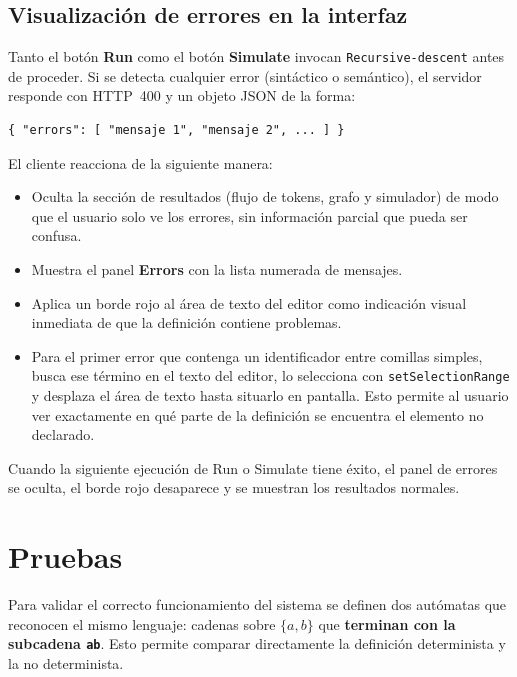 \documentclass{article}
\begin{document}
\subsection{Visualización de errores en la interfaz}

Tanto el botón \textbf{Run} como el botón \textbf{Simulate} invocan
\texttt{Recursive-descent} antes de proceder.
Si se detecta cualquier error (sintáctico o semántico), el servidor responde con
HTTP~400 y un objeto JSON de la forma:

\begin{verbatim}
{ "errors": [ "mensaje 1", "mensaje 2", ... ] }
\end{verbatim}

El cliente reacciona de la siguiente manera:

\begin{itemize}
  \item Oculta la sección de resultados (flujo de tokens, grafo y simulador)
        de modo que el usuario solo ve los errores, sin información parcial
        que pueda ser confusa.
  \item Muestra el panel \textbf{Errors} con la lista numerada de mensajes.
  \item Aplica un borde rojo al área de texto del editor como indicación visual
        inmediata de que la definición contiene problemas.
  \item Para el primer error que contenga un identificador entre comillas simples,
        busca ese término en el texto del editor, lo selecciona con
        \texttt{setSelectionRange} y desplaza el área de texto hasta situarlo
        en pantalla.
        Esto permite al usuario ver exactamente en qué parte de la definición
        se encuentra el elemento no declarado.
\end{itemize}

Cuando la siguiente ejecución de Run o Simulate tiene éxito, el panel de errores
se oculta, el borde rojo desaparece y se muestran los resultados normales.

\section{Pruebas}

Para validar el correcto funcionamiento del sistema se definen dos autómatas que reconocen
el mismo lenguaje: cadenas sobre $\{a, b\}$ que \textbf{terminan con la subcadena \texttt{ab}}.
Esto permite comparar directamente la definición determinista y la no determinista.
\end{document}
